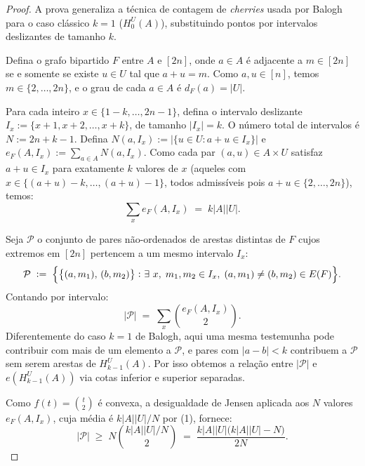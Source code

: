 \documentclass[reqno,a4paper,12pt]{amsart}
\begin{document}
\begin{proof}
  A prova generaliza a técnica de contagem de \emph{cherries} usada por Balogh para o caso
  clássico $k = 1$ ($H_0^U(A)$), substituindo pontos por intervalos deslizantes de tamanho $k$.

  Defina o grafo bipartido $F$ entre $A$ e $[2n]$, onde $a \in A$ é adjacente a
  $m \in [2n]$ se e somente se existe $u \in U$ tal que $a+u = m$.
  Como $a, u \in [n]$, temos $m \in \{2,\ldots,2n\}$, e o grau de cada $a \in A$ é
  $d_F(a) = |U|$.

  Para cada inteiro $x \in \{1-k, \ldots, 2n-1\}$, defina o intervalo deslizante
  $I_x := \{x+1, x+2, \ldots, x+k\}$, de tamanho $|I_x| = k$. O número total de intervalos
  é $N := 2n+k-1$. Defina $N(a, I_x) := |\{u \in U : a+u \in I_x\}|$ e
  $e_F(A, I_x) := \sum_{a \in A} N(a, I_x)$.
  Como cada par $(a,u) \in A \times U$ satisfaz $a+u \in I_x$ para exatamente $k$
  valores de $x$ (aqueles com $x \in \{(a+u)-k, \ldots, (a+u)-1\}$, todos
  admissíveis pois $a+u \in \{2,\ldots,2n\}$), temos:
  \[
    \sum_{x} e_F(A, I_x) \;=\; k|A||U|. \tag{1}
  \]

  Seja $\mathcal{P}$ o conjunto de pares não-ordenados de arestas distintas de $F$ cujos
  extremos em $[2n]$ pertencem a um mesmo intervalo $I_x$:
  \[
    \mathcal{P} \;:=\;
    \Bigl\{\bigl\{(a, m_1),\,(b, m_2)\bigr\} :
    \exists\, x,\; m_1, m_2 \in I_x,\;
    (a,m_1) \neq (b,m_2) \in E(F)\Bigr\}.
  \]
  Contando por intervalo:
  \[
    |\mathcal{P}| \;=\; \sum_{x} \binom{e_F(A,I_x)}{2}. \tag{2}
  \]
  Diferentemente do caso $k=1$ de Balogh, aqui uma mesma testemunha pode contribuir com
  mais de um elemento a $\mathcal{P}$, e pares com $|a-b| < k$ contribuem a $\mathcal{P}$
  sem serem arestas de $H_{k-1}^U(A)$. Por isso obtemos a relação entre $|\mathcal{P}|$ e
  $e(H_{k-1}^U(A))$ via cotas inferior e superior separadas.

  Como $f(t) = \binom{t}{2}$ é convexa, a desigualdade de Jensen aplicada aos
  $N$ valores $e_F(A, I_x)$, cuja média é $k|A||U|/N$ por (1), fornece:
  \[
    |\mathcal{P}|
    \;\geq\; N\binom{k|A||U|/N}{2}
    \;=\; \frac{k|A||U|\bigl(k|A||U| - N\bigr)}{2N}. \tag{3}
  \]


\end{proof}
\end{document}
